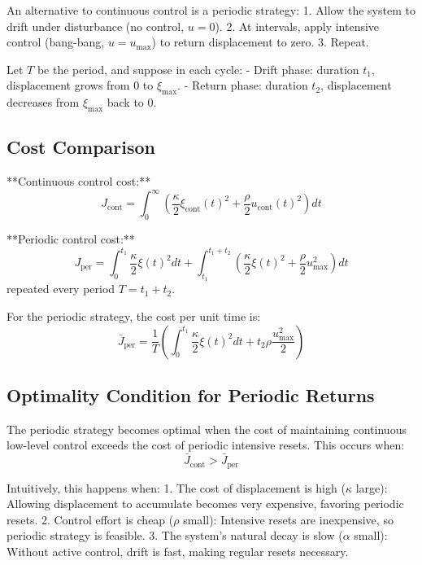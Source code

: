 \documentclass[12pt]{article}
\begin{document}
An alternative to continuous control is a periodic strategy:
1. Allow the system to drift under disturbance (no control, $u = 0$).
2. At intervals, apply intensive control (bang-bang, $u = u_{\max}$) to return displacement to zero.
3. Repeat.

Let $T$ be the period, and suppose in each cycle:
- Drift phase: duration $t_1$, displacement grows from $0$ to $\xi_{\max}$.
- Return phase: duration $t_2$, displacement decreases from $\xi_{\max}$ back to $0$.

\subsection{Cost Comparison}

**Continuous control cost:**
\begin{equation}
J_{\text{cont}} = \int_0^\infty \left( \frac{\kappa}{2} \xi_{\text{cont}}(t)^2 + \frac{\rho}{2} u_{\text{cont}}(t)^2 \right) dt
\end{equation}

**Periodic control cost:**
\begin{equation}
J_{\text{per}} = \int_0^{t_1} \frac{\kappa}{2} \xi(t)^2 dt + \int_{t_1}^{t_1+t_2} \left( \frac{\kappa}{2} \xi(t)^2 + \frac{\rho}{2} u_{\max}^2 \right) dt
\end{equation}
repeated every period $T = t_1 + t_2$.

For the periodic strategy, the cost per unit time is:
\begin{equation}
\bar{J}_{\text{per}} = \frac{1}{T} \left( \int_0^{t_1} \frac{\kappa}{2} \xi(t)^2 dt + t_2 \rho \frac{u_{\max}^2}{2} \right)
\end{equation}

\subsection{Optimality Condition for Periodic Returns}

The periodic strategy becomes optimal when the cost of maintaining continuous low-level control exceeds the cost of periodic intensive resets. This occurs when:
\begin{equation}
\bar{J}_{\text{cont}} > \bar{J}_{\text{per}}
\end{equation}

Intuitively, this happens when:
1. The cost of displacement is high ($\kappa$ large): Allowing displacement to accumulate becomes very expensive, favoring periodic resets.
2. Control effort is cheap ($\rho$ small): Intensive resets are inexpensive, so periodic strategy is feasible.
3. The system's natural decay is slow ($\alpha$ small): Without active control, drift is fast, making regular resets necessary.
\end{document}
